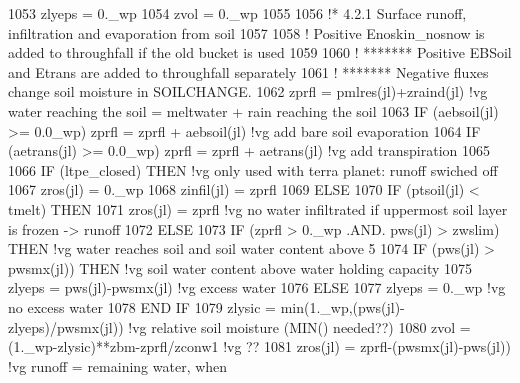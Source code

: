 \begin{DoxyCode}
1053         zlyeps = 0.\_wp
1054         zvol   = 0.\_wp
1055 
1056 \textcolor{comment}{!*    4.2.1  Surface runoff, infiltration and evaporation from soil}
1057 
1058         \textcolor{comment}{! Positive Enoskin\_nosnow is added to throughfall if the old bucket is used}
1059 
1060 \textcolor{comment}{!         ******* Positive EBSoil and Etrans are added to throughfall separately}
1061 \textcolor{comment}{!         ******* Negative fluxes change soil moisture in SOILCHANGE.}
1062           zprfl = pmlres(jl)+zraind(jl)                           \textcolor{comment}{!vg  water reaching the soil = meltwater
       + rain reaching the soil}
1063           \textcolor{keywordflow}{IF} (aebsoil(jl) >= 0.0\_wp) zprfl = zprfl + aebsoil(jl)  \textcolor{comment}{!vg  add bare soil evaporation}
1064           \textcolor{keywordflow}{IF} (aetrans(jl) >= 0.0\_wp) zprfl = zprfl + aetrans(jl)  \textcolor{comment}{!vg  add transpiration}
1065         
1066         \textcolor{keywordflow}{IF} (ltpe\_closed) \textcolor{keywordflow}{THEN}   \textcolor{comment}{!vg  only used with terra planet: runoff swiched off}
1067           zros(jl)   = 0.\_wp
1068           zinfil(jl) = zprfl
1069         \textcolor{keywordflow}{ELSE}
1070           \textcolor{keywordflow}{IF} (ptsoil(jl) < tmelt) \textcolor{keywordflow}{THEN}
1071             zros(jl) = zprfl            \textcolor{comment}{!vg  no water infiltrated if uppermost soil layer is frozen ->
       runoff}
1072           \textcolor{keywordflow}{ELSE}
1073             \textcolor{keywordflow}{IF} (zprfl > 0.\_wp .AND. pws(jl) > zwslim) \textcolor{keywordflow}{THEN}   \textcolor{comment}{!vg  water reaches soil and soil water content
       above 5%
1074               \textcolor{keywordflow}{IF} (pws(jl) > pwsmx(jl)) \textcolor{keywordflow}{THEN}                  \textcolor{comment}{!vg  soil water content above water holding
       capacity}
1075                 zlyeps = pws(jl)-pwsmx(jl)                   \textcolor{comment}{!vg     excess water}
1076               \textcolor{keywordflow}{ELSE}
1077                 zlyeps = 0.\_wp                               \textcolor{comment}{!vg     no excess water}
1078 \textcolor{keywordflow}{              END IF}
1079               zlysic     = min(1.\_wp,(pws(jl)-zlyeps)/pwsmx(jl))        \textcolor{comment}{!vg  relative soil moisture (MIN()
       needed??)}
1080               zvol       = (1.\_wp-zlysic)**zbm-zprfl/zconw1             \textcolor{comment}{!vg  ??}
1081               zros(jl)   = zprfl-(pwsmx(jl)-pws(jl))                    \textcolor{comment}{!vg  runoff = remaining water, when
}}
\end{DoxyCode}

